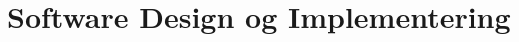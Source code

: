 \section{Software Design og Implementering} \label{ch:SWdesign}

 


\clearpage

\clearpage

\clearpage